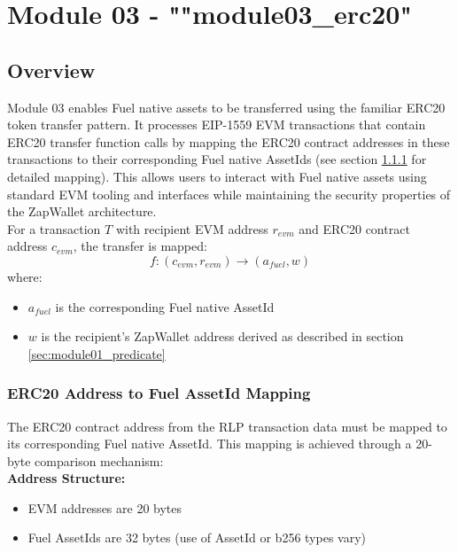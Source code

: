 \newpage
\section{Module 03 - {\ttfamily ""module03\_erc20"}}
\label{sec:module03_predicate}

\subsection{Overview}
Module 03 enables Fuel native assets to be transferred using the familiar ERC20 token transfer pattern. It processes EIP-1559 EVM transactions
that contain ERC20 transfer function calls by mapping the ERC20 contract addresses in these transactions to their corresponding Fuel native
AssetIds (see section \ref{subsec:asset_maapping:sec:module03_predicate} for detailed mapping). This allows users to interact with Fuel
native assets using standard EVM tooling and interfaces while maintaining the security properties of the ZapWallet architecture. \\

For a transaction $T$ with recipient EVM address $r_{evm}$ and ERC20 contract address $c_{evm}$, the transfer is mapped:
\[ f: (c_{evm}, r_{evm}) \rightarrow (a_{fuel}, w) \]
where:
\begin{itemize}
    \item $a_{fuel}$ is the corresponding Fuel native AssetId
    \item $w$ is the recipient's ZapWallet address derived as described in section \ref{sec:module01_predicate}
\end{itemize}





\subsubsection{ERC20 Address to Fuel AssetId Mapping}
\label{subsec:asset_maapping:sec:module03_predicate}
The ERC20 contract address from the RLP transaction data must be mapped to its corresponding Fuel native AssetId. This
mapping is achieved through a 20-byte comparison mechanism: \\

\textbf{Address Structure:}
\begin{itemize}
    \item EVM addresses are 20 bytes
    \item Fuel AssetIds are 32 bytes (use of AssetId or b256 types vary)
\end{itemize}

